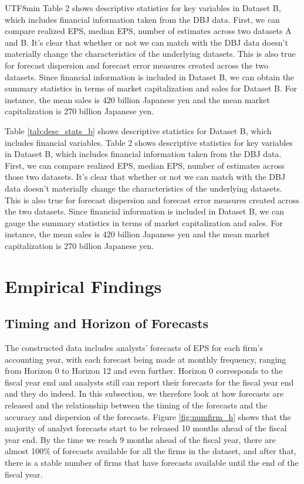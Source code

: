 \documentclass[12pt, a4paper]{article}
\begin{document}
\begin{CJK}{UTF8}{min}
Table 2 shows descriptive statistics for key variables in Dataset B, which includes financial information taken from the DBJ data. 
First, we can compare realized EPS, median EPS, number of estimates across two datasets A and B. 
It's clear that whether or not we can match with the DBJ data doesn't materially change the characteristics of the underlying datasets. 
This is also true for forecast dispersion and forecast error measures created across the two datasets. 
Since financial information is included in Dataset B, we can obtain the summary statistics in terms of market capitalization and sales for Dataset B. 
For instance, the mean sales is 420 billion Japanese yen and the mean market capitalization is 270 billion Japanese yen.




Table \ref{tab:desc_stats_b} shows descriptive statistics for Dataset B, which includes financial variables.
Table 2 shows descriptive statistics for key variables in Dataset B, which includes financial information taken from the DBJ data. 
First, we can compare realized EPS, median EPS, number of estimates across those two datasets. 
It's clear that whether or not we can match with the DBJ data doesn't materially change the characteristics of the underlying datasets. 
This is also true for forecast dispersion and forecast error measures created across the two datasets. 
Since financial information is included in Dataset B, we can gauge the summary statistics in terms of market capitalization and sales. 
For instance, the mean sales is 420 billion Japanese yen and the mean market capitalization is 270 billion Japanese yen.


\bigskip
\section{Empirical Findings}
\subsection{Timing and Horizon of Forecasts}
The constructed data includes analysts' forecasts of EPS for each firm's accounting year, with each forecast being made at monthly frequency, ranging from Horizon 0 to Horizon 12 and even further.
Horizon 0 corresponds to the fiscal year end and analysts still can report their forecasts for the fiscal year end and they do indeed.
In this subsection, we therefore look at how forecasts are released and the relationship between the timing of the forecasts and the accuracy and dispersion of the forecasts.
Figure \ref{fig:numfirm_h} shows that the majority of analyst forecasts start to be released 10 months ahead of the fiscal year end.
By the time we reach 9 months ahead of the fiscal year, there are almost 100\% of forecasts available for all the firms in the dataset, 
and after that, there is a stable number of firms that have forecasts available until the end of the fiscal year.



\end{CJK}
\end{document}
